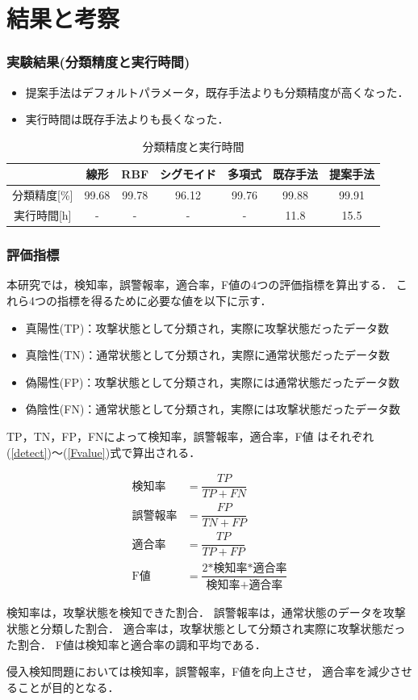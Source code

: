 \documentclass[11pt,dvipdfmx,cjk]{beamer}
\begin{document}
\section{結果と考察}
\begin{frame}
  \frametitle{実験結果(分類精度と実行時間)}
  \begin{itemize}
  \item 提案手法はデフォルトパラメータ，既存手法よりも分類精度が高くなった．
  \item 実行時間は既存手法よりも長くなった．
  \end{itemize}
  \begin{table}[b]
    \scriptsize
    \centering
    \caption{分類精度と実行時間}  %
    \begin{tabular}{|c|c|c|c|c|c|c|}  %
        \hline  %
        ~ & 線形 &RBF &シグモイド&多項式&既存手法 & 提案手法\\  %
        \hline  %
        分類精度[\%]& 99.68&99.78&96.12&99.76&99.88& 99.91\\  %
        \hline  %
        実行時間[h] & - & -&-&-&11.8& 15.5\\  %
        \hline  %
    \end{tabular}
  \end{table}
\end{frame}
\begin{frame}
  \frametitle{評価指標}
\begin{itemize}
本研究では，検知率，誤警報率，適合率，F値の4つの評価指標を算出する．
これら4つの指標を得るために必要な値を以下に示す．
\begin{itemize}
    \item 真陽性(TP)：攻撃状態として分類され，実際に攻撃状態だったデータ数
    \item 真陰性(TN)：通常状態として分類され，実際に通常状態だったデータ数
    \item 偽陽性(FP)：攻撃状態として分類され，実際には通常状態だったデータ数
    \item 偽陰性(FN)：通常状態として分類され，実際には攻撃状態だったデータ数
\end{itemize}
TP，TN，FP，FNによって検知率，誤警報率，適合率，F値
はそれぞれ(\ref{detect})〜(\ref{Fvalue})式で算出される．

\setlength{\jot}{12pt}
\begin{align}
\text{検知率} &= \dfrac{TP}{TP + FN}\label{detect}\\
\text{誤警報率} &= \dfrac{FP}{TN + FP}\\
\text{適合率} &= \dfrac{TP}{TP + FP}\\
\text{F値} &= \dfrac{2\text{*検知率*適合率}}{\text{検知率}+\text{適合率}}\label{Fvalue}
\end{align}

検知率は，攻撃状態を検知できた割合．
誤警報率は，通常状態のデータを攻撃状態と分類した割合．
適合率は，攻撃状態として分類され実際に攻撃状態だった割合．
F値は検知率と適合率の調和平均である．

侵入検知問題においては検知率，誤警報率，F値を向上させ，
適合率を減少させることが目的となる．
\end{itemize}
\end{frame}
\end{document}
